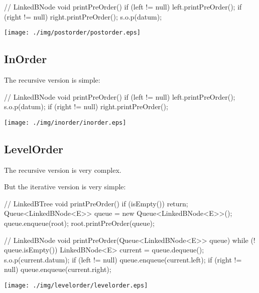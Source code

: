 \documentclass[a4paper, 9pt]{extarticle}
\begin{document}
\begin{multicols}{2}
\begin{blackboard}
// LinkedBNode
void printPreOrder() {
  if (left != null) {
    left.printPreOrder();
  }
  if (right != null) {
    right.printPreOrder();
  }
  s.o.p(datum);
}
\end{blackboard}
\columnbreak
\texttt{[image: ./img/postorder/postorder.eps]}
\end{multicols}

\subsection{InOrder}

The recursive version is simple:

\begin{multicols}{2}
\begin{blackboard}
// LinkedBNode
void printPreOrder() {
  if (left != null) {
    left.printPreOrder();
  }
  s.o.p(datum);
  if (right != null) {
    right.printPreOrder();
  }
}
\end{blackboard}
\columnbreak
\texttt{[image: ./img/inorder/inorder.eps]}
\end{multicols}

\newpage
\subsection{LevelOrder}

The recursive version is very complex.

But the iterative version is very simple:

\begin{multicols}{2}
\begin{blackboard}
// LinkedBTree
void printPreOrder() {
  if (isEmpty()) {
    return;
  }
  Queue<LinkedBNode<E>> queue =
    new Queue<LinkedBNode<E>>();
  queue.enqueue(root);
  root.printPreOrder(queue);
}

// LinkedBNode
void printPreOrder(Queue<LinkedBNode<E>> queue) {
  while (! queue.isEmpty()) {
    LinkedBNode<E> current = queue.dequeue();
    s.o.p(current.datum);
    if (left != null) {
      queue.enqueue(current.left);
    }
    if (right != null) {
      queue.enqueue(current.right);
    }
  }
}
\end{blackboard}
\columnbreak
\texttt{[image: ./img/levelorder/levelorder.eps]}
\end{multicols}
\end{document}
